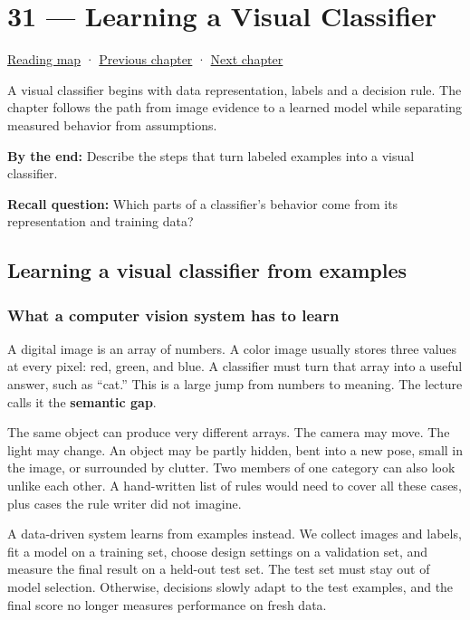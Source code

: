 \hypertarget{04-visual-computing-ii-ch031}{}
\chapter{31 --- Learning a Visual Classifier}\label{04-visual-computing-ii-ch031-learning-a-visual-classifier}

\hyperref[volume-reading-map]{Reading map} · \hyperref[04-visual-computing-ii-ch030]{Previous chapter} · \hyperref[04-visual-computing-ii-ch032]{Next chapter}

A visual classifier begins with data representation, labels and a decision rule. The chapter follows the path from image evidence to a learned model while separating measured behavior from assumptions.

\textbf{By the end:} Describe the steps that turn labeled examples into a visual classifier.

\textbf{Recall question:} Which parts of a classifier's behavior come from its representation and training data?

\section{Learning a visual classifier from examples}\label{04-visual-computing-ii-ch031-learning-a-visual-classifier-from-examples}

\subsection{What a computer vision system has to learn}\label{04-visual-computing-ii-ch031-what-a-computer-vision-system-has-to-learn}

A digital image is an array of numbers. A color image usually stores three values at every pixel: red, green, and blue. A classifier must turn that array into a useful answer, such as ``cat.'' This is a large jump from numbers to meaning. The lecture calls it the \textbf{semantic gap}.

The same object can produce very different arrays. The camera may move. The light may change. An object may be partly hidden, bent into a new pose, small in the image, or surrounded by clutter. Two members of one category can also look unlike each other. A hand-written list of rules would need to cover all these cases, plus cases the rule writer did not imagine.

A data-driven system learns from examples instead. We collect images and labels, fit a model on a training set, choose design settings on a validation set, and measure the final result on a held-out test set. The test set must stay out of model selection. Otherwise, decisions slowly adapt to the test examples, and the final score no longer measures performance on fresh data.

